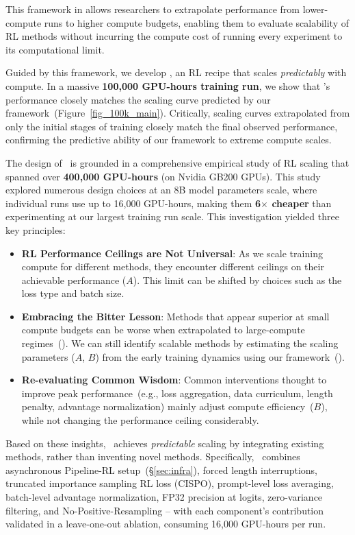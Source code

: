 This framework in  allows researchers to extrapolate performance from lower-compute runs to higher compute budgets, enabling them to evaluate scalability of RL methods without incurring the compute cost of running every experiment to its computational limit.




Guided by this framework, we develop \scalerl, an RL recipe that scales \emph{predictably} with compute.
In a massive \textbf{100,000 GPU-hours training run},  we show that \scalerl's performance closely matches the scaling curve predicted by our framework~(Figure~\ref{fig_100k_main}). Critically, scaling curves extrapolated from only the initial stages of training closely match the final observed performance, confirming the predictive ability of our framework to extreme compute scales.


The design of \scalerl\ is grounded in a comprehensive empirical study of RL scaling that spanned over \textbf{400,000 GPU-hours} (on Nvidia GB200 GPUs). This study explored numerous design choices at an 8B model parameters scale, where individual runs use up to 16,000 GPU-hours, making them \textbf{6$\times$ cheaper} than experimenting at our largest training run scale. This investigation yielded three key principles:
\begin{itemize}[leftmargin=2em]
    \item \textbf{RL Performance Ceilings are Not Universal}: As we scale training compute for different methods, they encounter different ceilings on their achievable performance ($A$). This limit can be shifted by choices such as the loss type and batch size.
    \item \textbf{Embracing the Bitter Lesson}: Methods that appear superior at small compute budgets can be worse when extrapolated to large-compute regimes~(). We can still identify scalable methods by estimating the scaling parameters ($A$, $B$) from the early training dynamics using our framework~().
    \item \textbf{Re-evaluating Common Wisdom}: Common interventions thought to improve peak performance~(e.g., loss aggregation, data curriculum, length penalty, advantage normalization) mainly adjust compute efficiency~($B$), while not changing the performance ceiling considerably. 
\end{itemize}

Based on these insights, \scalerl\ achieves \emph{predictable} scaling by integrating existing methods, rather than inventing novel methods. Specifically, \scalerl\ combines asynchronous Pipeline-RL setup~(\S\ref{sec:infra}), forced length interruptions, truncated importance sampling RL loss (CISPO), prompt-level loss averaging, batch-level advantage normalization, FP32 precision at logits, zero-variance filtering, and No-Positive-Resampling -- with each component's contribution validated in a leave-one-out ablation, consuming 16,000 GPU-hours per run.


